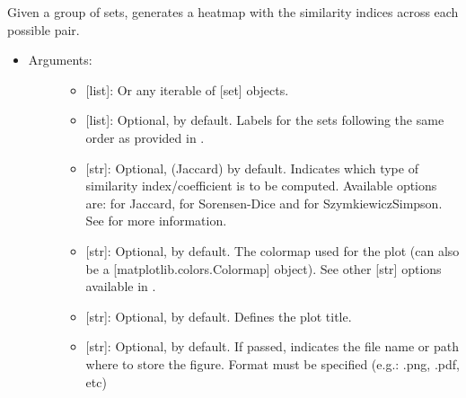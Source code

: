 \documentclass[letterpaper,10pt,english]{sphinxmanual}
\begin{document}
\begin{fulllineitems}
\label{\detokenize{plots:data_tools.plots.similarity_heatmap}}
Given a group of sets, generates a heatmap with the similarity
indices across each possible pair.
\begin{itemize}
\item {} \begin{description}
\item[{Arguments:}] \leavevmode\begin{itemize}
\item {} 
 {[}list{]}: Or any iterable of {[}set{]} objects.

\item {} 
 {[}list{]}: Optional,  by default. Labels for the
sets following the same order as provided in .

\item {} 
 {[}str{]}: Optional,  (Jaccard) by default.
Indicates which type of similarity index/coefficient is to be
computed. Available options are:  for Jaccard, 
for Sorensen-Dice and  for Szymkiewicz\textendash{}Simpson. See
{\hyperref[\detokenize{iterables:data_tools.iterables.similarity}]{}} for more
information.

\item {} 
 {[}str{]}: Optional,  by default. The
colormap used for the plot (can also be a
{[}matplotlib.colors.Colormap{]} object). See other {[}str{]} options
available in .

\item {} 
 {[}str{]}: Optional,  by default. Defines the plot
title.

\item {} 
 {[}str{]}: Optional,  by default. If passed,
indicates the file name or path where to store the figure.
Format must be specified (e.g.: .png, .pdf, etc)


\end{itemize}
\end{description}
\end{itemize}
\end{fulllineitems}
\end{document}
